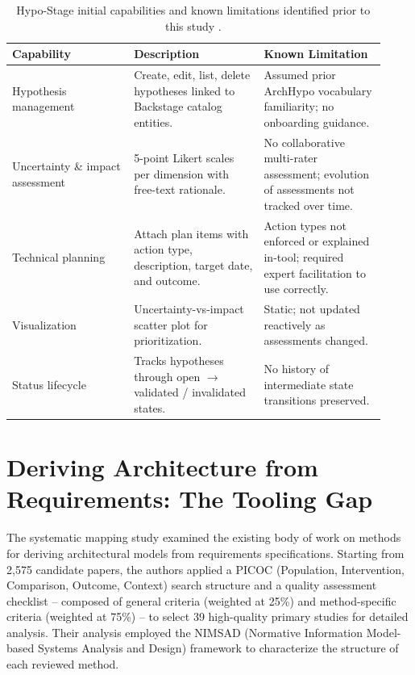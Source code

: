 \begin{table}[htbp]
\centering
\caption{Hypo-Stage initial capabilities and known limitations identified prior to this study \citep{correa2025}.}
\label{tab:hypostage-capabilities}
\begin{tabular}{p{0.30\linewidth} p{0.32\linewidth} p{0.30\linewidth}}
\toprule
\textbf{Capability} & \textbf{Description} & \textbf{Known Limitation} \\
\midrule
Hypothesis management & Create, edit, list, delete hypotheses linked to Backstage catalog entities. & Assumed prior ArchHypo vocabulary familiarity; no onboarding guidance. \\
\midrule
Uncertainty \& impact assessment & 5-point Likert scales per dimension with free-text rationale. & No collaborative multi-rater assessment; evolution of assessments not tracked over time. \\
\midrule
Technical planning & Attach plan items with action type, description, target date, and outcome. & Action types not enforced or explained in-tool; required expert facilitation to use correctly. \\
\midrule
Visualization & Uncertainty-vs-impact scatter plot for prioritization. & Static; not updated reactively as assessments changed. \\
\midrule
Status lifecycle & Tracks hypotheses through open $\rightarrow$ validated / invalidated states. & No history of intermediate state transitions preserved. \\
\bottomrule
\end{tabular}
\end{table}

\section{Deriving Architecture from Requirements: The Tooling Gap}
\label{sec:tooling-gap}

The systematic mapping study \citep{souza2019} examined
the existing body of work on methods for deriving architectural models from requirements
specifications. Starting from 2,575 candidate papers, the authors applied a PICOC
(Population, Intervention, Comparison, Outcome, Context) search structure and a quality
assessment checklist -- composed of general criteria (weighted at 25\%) and
method-specific criteria (weighted at 75\%) -- to select 39 high-quality primary studies
for detailed analysis. Their analysis employed the NIMSAD (Normative Information Model-based Systems Analysis and Design) framework to characterize the
structure of each reviewed method.

